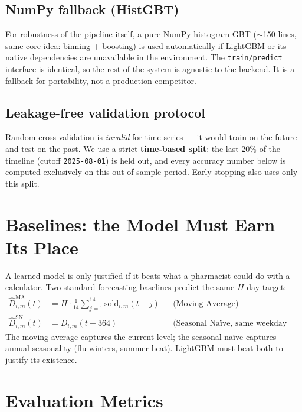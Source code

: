 \documentclass[11pt,a4paper]{article}
\begin{document}
\subsection{NumPy fallback (HistGBT)}
For robustness of the pipeline itself, a pure-NumPy histogram GBT ($\sim$150 lines, same core idea: binning + boosting) is used automatically if LightGBM or its native dependencies are unavailable in the environment. The \texttt{train/predict} interface is identical, so the rest of the system is agnostic to the backend. It is a fallback for portability, not a production competitor.

\subsection{Leakage-free validation protocol}
Random cross-validation is \emph{invalid} for time series --- it would train on the future and test on the past. We use a strict \textbf{time-based split}: the last 20\% of the timeline (cutoff \texttt{2025-08-01}) is held out, and every accuracy number below is computed exclusively on this out-of-sample period. Early stopping also uses only this split.

\section{Baselines: the Model Must Earn Its Place}

A learned model is only justified if it beats what a pharmacist could do with a calculator. Two standard forecasting baselines predict the same $H$-day target:
\begin{align}
\widehat{D}^{\mathrm{MA}}_{i,m}(t) &= H \cdot \frac{1}{14}\sum_{j=1}^{14} \text{sold}_{i,m}(t-j)
&& \text{(Moving Average)}\\[2pt]
\widehat{D}^{\mathrm{SN}}_{i,m}(t) &= D_{i,m}(t - 364)
&& \text{(Seasonal Na\"ive, same weekday one year ago)}
\end{align}
The moving average captures the current level; the seasonal na\"ive captures annual seasonality (flu winters, summer heat). LightGBM must beat both to justify its existence.

\section{Evaluation Metrics}
\end{document}
